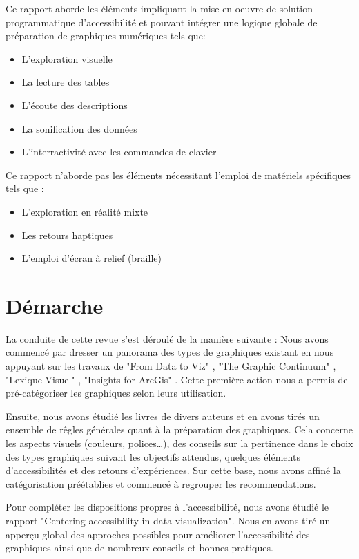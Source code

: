 \documentclass[a4paper,12pt]{article}
\begin{document}
\begin{multicols}{2}
Ce rapport aborde les éléments impliquant la mise en oeuvre de solution programmatique d'accessibilité et pouvant intégrer une logique globale de préparation de graphiques numériques tels que:
\begin{itemize}
\item L'exploration visuelle
\item La lecture des tables
\item L'écoute des descriptions
\item La sonification des données
\item L'interractivité avec les commandes de clavier
\end{itemize}

Ce rapport n'aborde pas les éléments nécessitant l'emploi de matériels spécifiques tels que :
\begin{itemize}
\item L'exploration en réalité mixte
\item Les retours haptiques
\item L'emploi d'écran à relief (braille)
\end{itemize}
\section*{Démarche}
\label{sec:org3736cc9}
La conduite de cette revue s'est déroulé de la manière suivante :
Nous avons commencé par dresser un panorama des types de graphiques existant en nous appuyant sur les travaux de "From Data to Viz" \autocite{yanholtzDataViz2018}, "The Graphic Continuum" \autocite{jonathanschwabishGraphicContinuum2014}, "Lexique Visuel" \autocite{alansmithLexiqueVisuel}, "Insights for ArcGis" \autocite{lindabealeInsightsArcGIS2017}.
Cette première action nous a permis de pré-catégoriser les graphiques selon leurs utilisation.

Ensuite, nous avons étudié les livres de divers auteurs et en avons tirés un ensemble de rêgles générales quant à la préparation des graphiques. Cela concerne les aspects visuels (couleurs, polices\ldots{}), des conseils sur la pertinence dans le choix des types graphiques suivant les objectifs attendus, quelques éléments d'accessibilités et des retours d'expériences. Sur cette base, nous avons affiné la catégorisation préétablies et commencé à regrouper les recommendations.

Pour compléter les dispositions propres à l'accessibilité, nous avons étudié le rapport "Centering accessibility in data visualization". \autocite{schwabishCenteringAccessibilityData2022} Nous en avons tiré un apperçu global des approches possibles pour améliorer l'accessibilité des graphiques ainsi que de nombreux conseils et bonnes pratiques.


\end{multicols}
\end{document}
